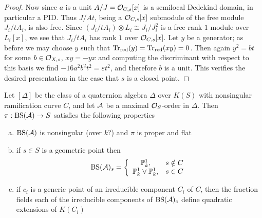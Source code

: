 \begin{proof}
Now since $a$ is a unit $A/J = \mathcal{O}_{C,s}[x]$ is a semilocal Dedekind domain, in particular a PID.  Thus $J/At$, being a $\mathcal{O}_{C,s}[x]$ submodule of the free module $J_i/tA_i$, is also free.  Since $(J_i/tA_i)\otimes L_i\cong J_i/J_i^2$ is a free rank $1$ module over $L_i[x]$, we see that $J_i/tA_i$ has rank $1$ over $\mathcal{O}_{C,s}[x]$.  Let $y$ be a generator; as before we may choose $y$ such that $\textnormal{Tr}_{\text{red}}(y) = \textnormal{Tr}_{\text{red}}(xy) =0$.  Then again $y^2 = bt$ for some $b\in\mathcal{O}_{X,s}$, $xy = -yx$ and computing the discriminant with respect to this basis we find $-16a^2b^2t^2 = \varepsilon t^2$, and therefore $b$ is a unit.  This verifies the desired presentation in the case that $s$ is a closed point.
\end{proof} 

\begin{prop}
Let $[\Delta]$ be the class of a quaternion algebra $\Delta$ over $K(S)$ with nonsingular ramification curve $C$, and let $\mathcal{A}$ be a maximal $\mathcal{O}_S$-order in $\Delta$.  Then $\pi: \textnormal{BS}(\mathcal{A})\rightarrow S$ satisfies the following properties
\begin{enumerate}[(a)]
\item  $\textnormal{BS}(\mathcal{A})$ is nonsingular (over $k$?) and $\pi$ is proper and flat
\item  if $s\in S$ is a geometric point then
$$\textnormal{BS}(\mathcal{A})_s = \left\lbrace \begin{array}{cl}
\mathbb{P}^1_{k},              & s\notin C\\
\mathbb{P}^1_{k}\vee\mathbb{P}^1_{k},& s\in    C
\end{array}\right.$$
\item  if $c_i$ is a generic point of an irreducible component $C_i$ of $C$, then the fraction fields each of the irreducible components of $\textnormal{BS}(\mathcal{A})_c$ define quadratic extensions of $K(C_i)$
\end{enumerate}
\end{prop}
